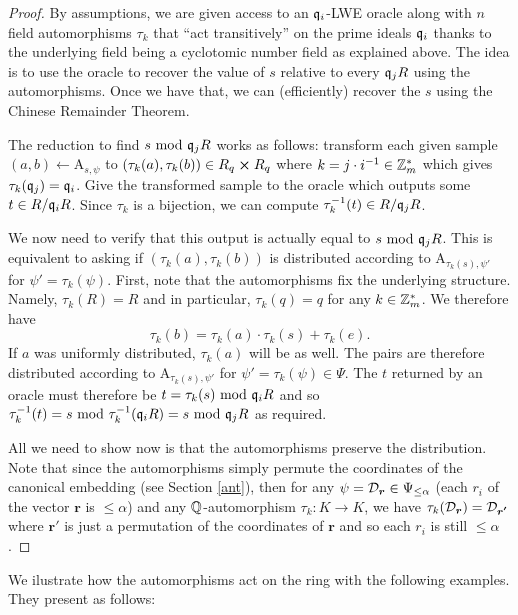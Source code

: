 \begin{proof}
	By assumptions, we are given access to an $\mathfrak{q}_i$-LWE oracle along with $n$ field automorphisms $\tau_k$ that ``act transitively'' on the prime ideals $\mathfrak{q}_i$ thanks to the underlying field being a cyclotomic number field as explained above. The idea is to use the oracle to recover the value of $s$ relative to every $\mathfrak{q}_j R$ using the automorphisms. Once we have that, we can (efficiently) recover the $s$ using the Chinese Remainder Theorem. 

	The reduction to find $s \text{ mod } \mathfrak{q}_j R$ works as follows: transform each given sample $(a,b) \leftarrow \text{A}_{s, \psi}$ to $(\tau_k(a), \tau_k(b)) \in R_q \cross R_q$ where $k = j \cdot i^{-1} \in \mathbb{Z}^*_m$ which gives $\tau_k(\mathfrak{q}_j) = \mathfrak{q}_i$. Give the transformed sample to the oracle which outputs some $t \in R / \mathfrak{q}_i R$. Since $\tau_k$ is a bijection, we can compute $\tau^{-1}_k(t) \in R / \mathfrak{q}_j R$.

	We now need to verify that this output is actually equal to $s \text{ mod } \mathfrak{q}_j R$. This is equivalent to asking if $(\tau_k(a), \tau_k(b))$ is distributed according to A$_{\tau_k(s), \psi '}$ for $\psi ' = \tau_k(\psi)$. First, note that the automorphisms fix the underlying structure. Namely, $\tau_k(R) = R$ and in particular, $\tau_k(q) = q$ for any $k \in \mathbb{Z}_m^*$. We therefore have
	\[ \tau_k(b) = \tau_k(a)\cdot \tau_k(s) + \tau_k(e).\]
	If $a$ was uniformly distributed, $\tau_k(a)$ will be as well. The pairs are therefore distributed according to A$_{\tau_k(s), \psi '}$ for $\psi ' = \tau_k(\psi) \in \Psi$. The $t$ returned by an oracle must therefore be $t = \tau_k(s) \text{ mod } \mathfrak{q}_i R$ and so $\tau_k^{-1}(t) = s \text{ mod } \tau_k^{-1}(\mathfrak{q}_i R) = s \text{ mod } \mathfrak{q}_j R$ as required. 

	All we need to show now is that the automorphisms preserve the distribution. Note that since the automorphisms simply permute the coordinates of the canonical embedding (see Section \ref{ant}), then for any $\psi = \mathcal{D}_{\boldsymbol{r}} \in \Psi_{\leq \alpha}$ (each $r_i$ of the vector $\bm{r}$ is $\leq \alpha$) and any $\mathbb{Q}$-automorphism $\tau_k: K \rightarrow K$, we have $\tau_k(\mathcal{D}_{\boldsymbol{r}}) = \mathcal{D}_{\boldsymbol{r'}}$ where $\bm{r'}$ is just a permutation of the coordinates of $\bm{r}$ and so each $r_i$ is still $\leq \alpha$.

\end{proof}
We ilustrate how the automorphisms act on the ring with the following examples. They present as follows:
